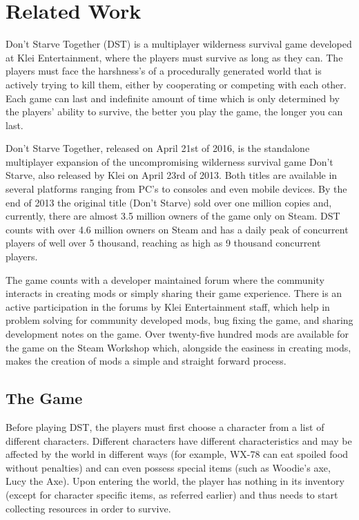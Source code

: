 \section{Related Work}
Don’t Starve Together (DST) is a multiplayer wilderness survival game developed at Klei Entertainment, where the players must survive as long as they can.
The players must face the harshness’s of a procedurally generated world that is actively trying to kill them, either by cooperating or competing with each other.
Each game can last and indefinite amount of time which is only determined by the players’ ability to survive, the better you play the game, the longer you can last.

Don’t Starve Together, released on April 21st of 2016, is the standalone multiplayer expansion of the uncompromising wilderness survival game Don’t Starve, also released by Klei on April 23rd of 2013.
Both titles are available in several platforms ranging from PC’s to consoles and even mobile devices.
By the end of 2013 the original title (Don’t Starve) sold over one million copies and, currently, there are almost 3.5 million owners of the game only on Steam.
DST counts with over 4.6 million owners on Steam and has a daily peak of concurrent players of well over 5 thousand, reaching as high as 9 thousand concurrent players.

The game counts with a developer maintained forum where the community interacts in creating mods or simply sharing their game experience.
There is an active participation in the forums by Klei Entertainment staff, which help in problem solving for community developed mods, bug fixing the game, and sharing development notes on the game.
Over twenty-five hundred mods are available for the game on the Steam Workshop which, alongside the easiness in creating mods, makes the creation of mods a simple and straight forward process.

\subsection*{The Game}
Before playing DST, the players must first choose a character from a list of different characters.
Different characters have different characteristics and may be affected by the world in different ways (for example, WX-78 can eat spoiled food without penalties) and can even possess special items (such as Woodie’s axe, Lucy the Axe).
Upon entering the world, the player has nothing in its inventory (except for character specific items, as referred earlier) and thus needs to start collecting resources in order to survive.

